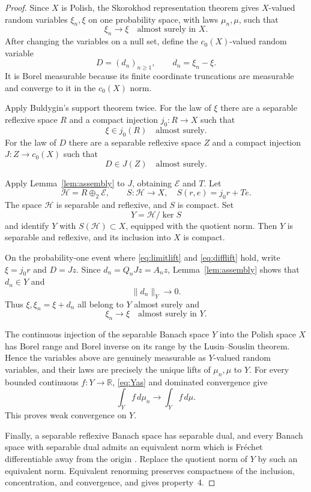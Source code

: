 \documentclass[11pt]{article}
\newcommand{\cnull}{c_0(X)}
\begin{document}
\begin{proof}
Since $X$ is Polish, the Skorokhod representation theorem gives $X$-valued
random variables $\xi_n,\xi$ on one probability space, with laws
$\mu_n,\mu$, such that
\begin{equation}\label{eq:skorokhod}
  \xi_n\longrightarrow\xi\quad\text{almost surely in }X.
\end{equation}
After changing the variables on a null set, define the $\cnull$-valued random
variable
\[
  D=(d_n)_{n\geq1},\qquad d_n=\xi_n-\xi.
\]
It is Borel measurable because its finite coordinate truncations are
measurable and converge to it in the $c_0(X)$ norm.

Apply Buldygin's support theorem twice.  For the law of $\xi$ there are a
separable reflexive space $R$ and a compact injection $j_0:R\to X$ such that
\begin{equation}\label{eq:limitlift}
  \xi\in j_0(R)\quad\text{almost surely}.
\end{equation}
For the law of $D$ there are a separable reflexive space $Z$ and a compact
injection $J:Z\to\cnull$ such that
\begin{equation}\label{eq:difflift}
  D\in J(Z)\quad\text{almost surely}.
\end{equation}

Apply Lemma~\ref{lem:assembly} to $J$, obtaining $\mathcal E$ and $T$.
Let
\[
  \mathcal H=R\oplus_2\mathcal E,
  \qquad
  S:\mathcal H\to X,\quad S(r,e)=j_0r+Te.
\]
The space $\mathcal H$ is separable and reflexive, and $S$ is compact.  Set
\[
  Y=\mathcal H/\ker S
\]
and identify $Y$ with $S(\mathcal H)\subset X$, equipped with the quotient
norm.  Then $Y$ is separable and reflexive, and its inclusion into $X$ is
compact.

On the probability-one event where \eqref{eq:limitlift} and
\eqref{eq:difflift} hold, write $\xi=j_0r$ and $D=Jz$.  Since
$d_n=Q_nJz=A_nz$, Lemma~\ref{lem:assembly} shows that $d_n\in Y$ and
\[
  \|d_n\|_Y\longrightarrow0.
\]
Thus $\xi,\xi_n=\xi+d_n$ all belong to $Y$ almost surely and
\begin{equation}\label{eq:Yas}
  \xi_n\longrightarrow\xi\quad\text{almost surely in }Y.
\end{equation}

The continuous injection of the separable Banach space $Y$ into the Polish
space $X$ has Borel range and Borel inverse on its range by the
Lusin--Souslin theorem.  Hence the variables above are genuinely measurable
as $Y$-valued random variables, and their laws are precisely the unique lifts
of $\mu_n,\mu$ to $Y$.  For every bounded continuous $f:Y\to\mathbb R$,
\eqref{eq:Yas} and dominated convergence give
\[
  \int_Y f\,d\mu_n\longrightarrow\int_Y f\,d\mu.
\]
This proves weak convergence on $Y$.

Finally, a separable reflexive Banach space has separable dual, and every
Banach space with separable dual admits an equivalent norm which is
Fr\'echet differentiable away from the origin \cite{DGZ}.  Replace the
quotient norm of $Y$ by such an equivalent norm.  Equivalent renorming
preserves compactness of the inclusion, concentration, and convergence, and
gives property~4.
\end{proof}
\end{document}
